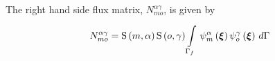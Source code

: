 The right hand side flux matrix, $N^{\alpha\gamma}_{mo}$, is given by
\begin{equation}
  N^{\alpha\gamma}_{mo} = \gsf{m}{\alpha}\gsf{o}{\gamma}
  \gint{\Gamma_{f}}{}{\gbfn{m}{\alpha}{\vect{\xi}}\gbfn{o}{\gamma}{\vect{\xi}}}{\Gamma}
\end{equation}





